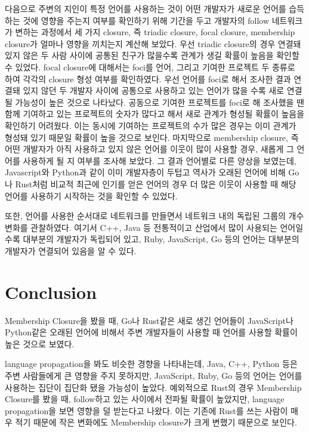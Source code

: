 \documentclass[10pt, a4paper, titlepage]{article}
\begin{document}
다음으로 주변의 지인이 특정 언어를 사용하는 것이 어떤 개발자가 새로운 언어를 습득하는 것에 영향을 주는지 여부를 확인하기 위해 기간을 두고 개발자의 follow 네트워크가 변하는 과정에서 세 가지 closure, 즉 triadic closure, focal closure, membership closure가 얼마나 영향을 끼치는지 계산해 보았다. 우선 triadic closure의 경우 연결돼 있지 않은 두 사람 사이에 공통된 친구가 많을수록 관계가 생길 확률이 높음을 확인할 수 있었다. focal closure에 대해서는 foci를 언어, 그리고 기여한 프로젝트 두 종류로 하여 각각의 closure 형성 여부를 확인하였다. 우선 언어를 foci로 해서 조사한 결과 연결돼 있지 않던 두 개발자 사이에 공통으로 사용하고 있는 언어가 많을 수록 새로 연결될 가능성이 높은 것으로 나타났다. 공동으로 기여한 프로젝트를 foci로 해 조사했을 땐 함께 기여하고 있는 프로젝트의 숫자가 많다고 해서 새로 관계가 형성될 확률이 높음을 확인하기 어려웠다. 이는 동시에 기여하는 프로젝트의 수가 많은 경우는 이미 관계가 형성돼 있기 때문일 확률이 높을 것으로 보인다. 마지막으로 membership closure, 즉 어떤 개발자가 아직 사용하고 있지 않은 언어를 이웃이 많이 사용할 경우, 새롭게 그 언어를 사용하게 될 지 여부를 조사해 보았다. 그 결과 언어별로 다른 양상을 보였는데, Javascript와 Python과 같이 이미 개발자층이 두텁고 역사가 오래된 언어에 비해 Go나 Rust처럼 비교적 최근에 인기를 얻은 언어의 경우 더 많은 이웃이 사용할 때 해당 언어를 사용하기 시작하는 것을 확인할 수 있었다.

또한, 언어를 사용한 순서대로 네트워크를 만들면서 네트워크 내의 독립된 그룹의 개수 변화를 관찰하였다. 여기서 C++, Java 등 전통적이고 산업에서 많이 사용되는 언어일수록 대부분의 개발자가 독립되어 있고, Ruby, JavaScript, Go 등의 언어는 대부분의 개발자가 연결되어 있음을 알 수 있다.


\section{Conclusion}

Membership Closure을 봤을 때, Go나 Rust같은 새로 생긴 언어들이 JavaScript나 Python같은 오래된 언어에 비해서 주변 개발자들이 사용할 때 언어를 사용할 확률이 높은 것으로 보였다.

language propagation을 봐도 비슷한 경향을 나타내는데, Java, C++, Python 등은 주변 사람들에게 큰 영향을 주지 못하지만, JavaScript, Ruby, Go 등의 언어는 언어를 사용하는 집단이 집단화 됐을 가능성이 높았다. 예외적으로 Rust의 경우 Membership Closure를 봤을 때, follow하고 있는 사이에서 전파될 확률이 높았지만, language propagation을 보면 영향을 덜 받는다고 나왔다. 이는 기존에 Rust를 쓰는 사람이 매우 적기 때문에 작은 변화에도 Membership closure가 크게 변했기 때문으로 보인다.
\end{document}
